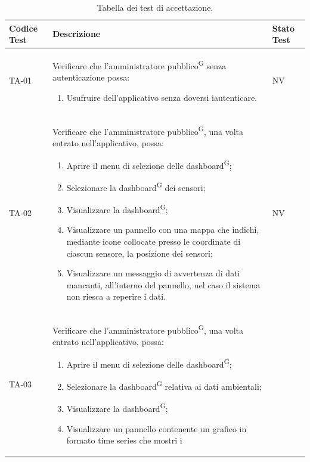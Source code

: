 \documentclass[8pt]{article}
\newcommand{\glossterm}[1]{#1\textsuperscript{G}} %
\begin{document}
\renewcommand{\arraystretch}{2.5}
\begin{longtable}{|>{\centering}p{2cm}|>{\RaggedRight}m{12cm}|>{\centering\arraybackslash}p{2cm}|}
    \hline
    \rowcolor{white}
    \textbf{Codice Test} & \textbf{Descrizione} & \textbf{Stato Test} \\
    \hline
    \endfirsthead 
    \rowcolor{white}
    \caption{Tabella dei test di accettazione.} 
    \label{table:Tabella dei test di accettazione}
    \endlastfoot  
    TA-01 & Verificare che l’\glossterm{amministratore pubblico} senza autenticazione possa:
    \begin{enumerate}
        \setlength\itemsep{0em}
        \item Usufruire dell’applicativo senza doversi iautenticare.
    \end{enumerate} & NV \\
    \hline
    TA-02 & Verificare che l’\glossterm{amministratore pubblico}, una volta entrato nell'applicativo, possa:
    \begin{enumerate}
        \setlength\itemsep{0em}
        \item Aprire il menu di selezione delle \glossterm{dashboard};
        \item Selezionare la \glossterm{dashboard} dei sensori;
        \item Visualizzare la \glossterm{dashboard};
        \item Visualizzare un pannello con una mappa che indichi, mediante icone collocate presso le coordinate di ciascun sensore, la posizione dei sensori;
        \item Visualizzare un messaggio di avvertenza di dati mancanti, all’interno del pannello, nel caso il sistema non riesca a reperire i dati.
    \end{enumerate}
    & NV \\
    \hline
    TA-03 & Verificare che l’\glossterm{amministratore pubblico}, una volta entrato nell'applicativo, possa:
    \begin{enumerate}
        \setlength\itemsep{0em}
        \item Aprire il menu di selezione delle \glossterm{dashboard};
        \item Selezionare la \glossterm{dashboard} relativa ai dati ambientali;
        \item Visualizzare la \glossterm{dashboard};
        \item Visualizzare un pannello contenente un grafico in formato time series che mostri i

\end{enumerate}
\end{longtable}
\end{document}
